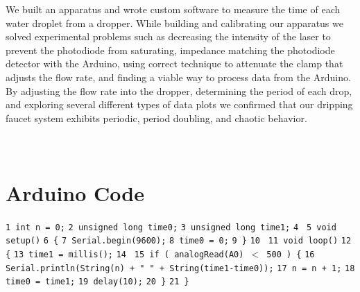 \documentclass[11pt]{article}
\begin{document}
We built an apparatus and wrote custom software to measure the time of each water droplet from a dropper. While building and calibrating our apparatus we solved experimental problems such as decreasing the intensity of the laser to prevent the photodiode from saturating, impedance matching the photodiode detector with the Arduino, using correct technique to attenuate the clamp that adjusts the flow rate, and finding a viable way to process data from the Arduino. By adjusting the flow rate into the dropper, determining the period of each drop, and exploring several different types of data plots we confirmed that our dripping faucet system exhibits periodic, period doubling, and chaotic behavior.

\newpage
\appendix
\section{\\Arduino Code} \label{App:AppendixA}

\texttt{1 \quad int n = 0;\newline}
\texttt{2 \quad unsigned long time0;\newline}
\texttt{3 \quad unsigned long time1;\newline}
\texttt{4 \newline}
\texttt{5 \quad void setup()\newline}
\texttt{6 \quad \{\newline}
\texttt{7 \quad \quad Serial.begin(9600);\newline}
\texttt{8 \quad \quad time0 = 0;\newline}
\texttt{9 \quad \}\newline}
\texttt{10 \quad \newline}
\texttt{11 \quad void loop()\newline}
\texttt{12 \quad \{\newline}
\texttt{13 \quad \quad time1 = millis();\newline}
\texttt{14 \quad \newline}
\texttt{15 \quad \quad if ( analogRead(A0) $<$ 500 ) \{\newline}
\texttt{16 \quad \quad \quad \quad Serial.println(String(n) + " " + String(time1-time0));\newline}
\texttt{17 \quad \quad \quad \quad n = n + 1;\newline}
\texttt{18 \quad \quad \quad \quad time0 = time1;\newline}
\texttt{19 \quad \quad \quad \quad delay(10);\newline}
\texttt{20 \quad \quad \}\newline}
\texttt{21 \quad \}\newline}
\end{document}
